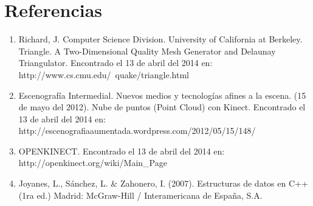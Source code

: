 \documentclass[letterpaper]{article}
\begin{document}
\section{Referencias}

\begin{enumerate}

\item Richard, J. Computer Science Division. University of California at Berkeley. Triangle. A Two-Dimensional Quality Mesh Generator and 
Delaunay Triangulator. Encontrado el 13 de abril del 2014 en: http://www.cs.cmu.edu/~quake/triangle.html
\item Escenografía Intermedial. Nuevos medios y tecnologías afines a la escena. (15 de mayo del 2012).
Nube de puntos (Point Cloud) con Kinect. Encontrado el 13 de abril del 2014 en: http://escenografiaaumentada.wordpress.com/2012/05/15/148/
\item OPENKINECT. Encontrado el 13 de abril del 2014 en: http://openkinect.org/wiki/Main\_Page
\item Joyanes, L., Sánchez, L. \& Zahonero, I. (2007). Estructuras de datos en C++ (1ra ed.) Madrid: McGraw-Hill / Interamericana de España, S.A.



\end{enumerate}

	
\end{document}
